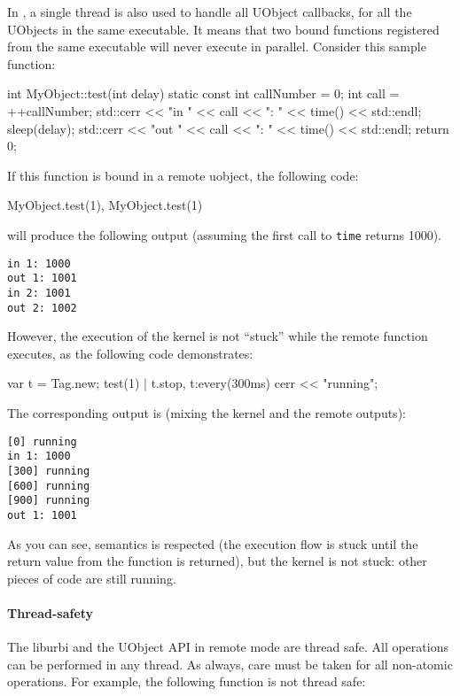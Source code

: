 In , a single thread is also used to handle all
UObject callbacks, for all the UObjects in the same executable. It
means that two bound functions registered from the same executable
will never execute in parallel. Consider this sample \Cxx function:

\begin{cxx}
int MyObject::test(int delay)
{
  static const int callNumber = 0;
  int call = ++callNumber;
  std::cerr << "in "  << call << ": " << time() << std::endl;
  sleep(delay);
  std::cerr << "out " << call << ": " << time() << std::endl;
  return 0;
}
\end{cxx}

If this function is bound in a remote uobject, the following code:

\begin{cxx}
MyObject.test(1), MyObject.test(1)
\end{cxx}

\noindent
will produce the following output (assuming the first call to
\lstinline|time| returns 1000).

\begin{lstlisting}
in 1: 1000
out 1: 1001
in 2: 1001
out 2: 1002
\end{lstlisting}

However, the execution of the \urbi kernel is not ``stuck'' while the
remote function executes, as the following code demonstrates:

\begin{urbiunchecked}
var t = Tag.new;
test(1) | t.stop,
t:every(300ms)
  cerr << "running";
\end{urbiunchecked}

The corresponding output is (mixing the kernel and the remote outputs):

\begin{lstlisting}
[0] running
in 1: 1000
[300] running
[600] running
[900] running
out 1: 1001
\end{lstlisting}

As you can see, \urbi semantics is respected (the execution flow is
stuck until the return value from the function is returned), but the
kernel is not stuck: other pieces of code are still running.

\paragraph{Thread-safety}

The liburbi and the UObject API in remote mode are thread safe. All
operations can be performed in any thread. As always, care must be
taken for all non-atomic operations. For example, the following
function is not thread safe:

